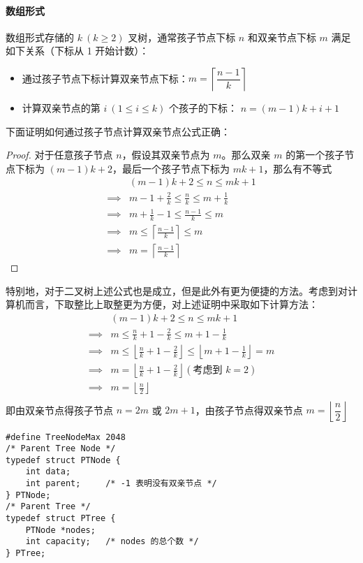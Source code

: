 \documentclass{ctexart}
\begin{document}
\paragraph{数组形式}
数组形式存储的 $k\ (k \ge 2)$ 叉树，通常孩子节点下标 $n$ 和双亲节点下标 $m$ 满足如下关系（下标从 1 开始计数）：
\begin{itemize}
    \item 通过孩子节点下标计算双亲节点下标：$m = \left\lceil \dfrac{n-1}{k} \right\rceil$
    \item 计算双亲节点的第 $i\ (1 \le i \le k)$ 个孩子的下标： $n = (m - 1)k+i+1$
\end{itemize}
下面证明如何通过孩子节点计算双亲节点公式正确：
\begin{proof}
    对于任意孩子节点 $n$，假设其双亲节点为 $m$。那么双亲 $m$ 的第一个孩子节点下标为 $(m-1) k+2$，最后一个孩子节点下标为 $mk+1$，那么有不等式
    $$
    \begin{aligned}
    & (m-1)k + 2 \le n \le mk+1 \\
        \implies & m -1 + \frac{2}{k} \le \frac{n}{k} \le m+\frac{1}{k} \\
        \implies & m+ \frac{1}{k} - 1 \le \frac{n-1}{k} \le m \\
        \implies & m \le \left\lceil \frac{n-1}{k} \right\rceil \le m \\
        \implies & m = \left\lceil \frac{n-1}{k} \right\rceil
    \end{aligned}
    $$
\end{proof}
特别地，对于二叉树上述公式也是成立，但是此外有更为便捷的方法。考虑到对计算机而言，下取整比上取整更为方便，对上述证明中采取如下计算方法：
$$
\begin{aligned}
& (m-1)k + 2 \le n \le mk+1 \\
    \implies & m \le \frac{n}{k} + 1 - \frac{2}{k} \le m + 1 - \frac{1}{k} \\
    \implies & m \le \left\lfloor \frac{n}{k} + 1 - \frac{2}{k} \right\rfloor \le \left\lfloor m + 1-\frac{1}{k} \right\rfloor = m \\
    \implies & m = \left\lfloor \frac{n}{k} + 1 - \frac{2}{k} \right\rfloor (\text{考虑到 } k = 2) \\
    \implies & m = \left\lfloor \frac{n}{2} \right\rfloor \\
\end{aligned}
$$
即由双亲节点得孩子节点 $n = 2m$ 或 $2m + 1$，由孩子节点得双亲节点 $m = \left\lfloor \dfrac{n}{2} \right\rfloor$

\begin{verbatim}
#define TreeNodeMax 2048
/* Parent Tree Node */
typedef struct PTNode {
    int data;
    int parent;     /* -1 表明没有双亲节点 */
} PTNode;
/* Parent Tree */
typedef struct PTree {
    PTNode *nodes;
    int capacity;   /* nodes 的总个数 */
} PTree;
\end{verbatim}
\end{document}
